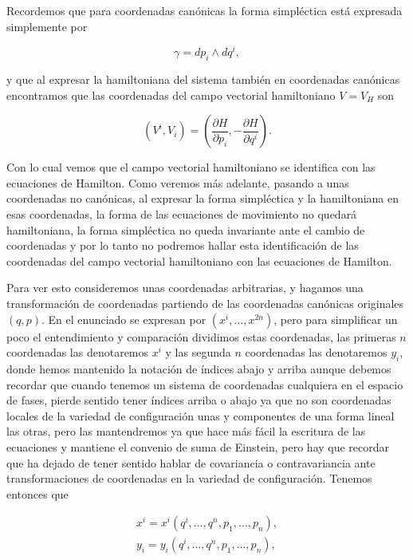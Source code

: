 \documentclass[a4paper,10pt]{article}
\numberwithin{equation}{section}
\begin{document}
Recordemos que para coordenadas canónicas la forma simpléctica está expresada 
simplemente por 

\begin{equation}
 \gamma = dp_i \wedge dq^i,
\end{equation}

y que al expresar la hamiltoniana del sistema también en coordenadas canónicas 
encontramos que las coordenadas del campo vectorial hamiltoniano $V = V_H$ son 

\begin{equation}
 (V^i,V_i) = \left(\frac{\partial H}{\partial p_i}, - \frac{\partial H}{\partial q^i}\right).
\end{equation}

Con lo cual vemos que el campo vectorial hamiltoniano se identifica con las ecuaciones de 
Hamilton. Como veremos más adelante, pasando a unas coordenadas no canónicas, al expresar 
la forma simpléctica y la hamiltoniana en esas coordenadas, la forma de las ecuaciones de 
movimiento no quedará hamiltoniana, la forma simpléctica no queda invariante ante 
el cambio de coordenadas y por lo tanto no podremos hallar esta identificación de las 
coordenadas del campo vectorial hamiltoniano con las ecuaciones de Hamilton.

\vspace{.3cm}

Para ver esto consideremos unas coordenadas arbitrarias, y hagamos una transformación 
de coordenadas partiendo de las coordenadas canónicas originales $(q,p)$. En el enunciado 
se expresan por $(x^i,\dots,x^{2n})$, pero para simplificar un poco el entendimiento 
y comparación dividimos estas coordenadas, las primeras $n$ coordenadas las denotaremos 
$x^i$ y las segunda $n$ coordenadas las denotaremos $y_i$, donde hemos mantenido la notación 
de índices abajo y arriba aunque debemos recordar que cuando tenemos un sistema 
de coordenadas cualquiera en el espacio de fases, pierde sentido tener índices arriba 
o abajo ya que no son coordenadas locales de la variedad de configuración unas 
y componentes de una forma lineal las otras, pero las mantendremos ya que hace más fácil 
la escritura de las ecuaciones y mantiene el convenio de suma de Einstein, pero 
hay que recordar que ha dejado de tener sentido hablar de covariancia o contravariancia 
ante transformaciones de coordenadas en la variedad de configuración. Tenemos entonces 
que 

\begin{align}
 x^i = x^i(q^i,\dots,q^n,p_1,\dots,p_n), \\
 y_i = y_i(q^i,\dots,q^n,p_1,\dots,p_n),
\end{align}
\end{document}
